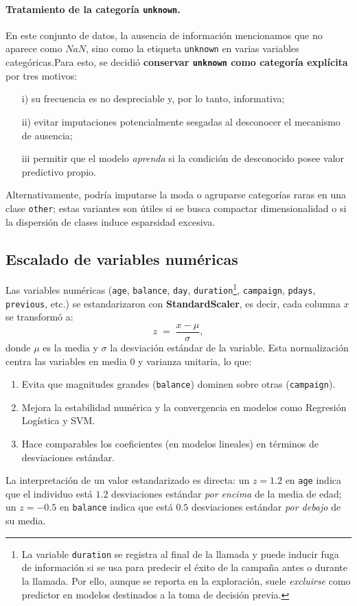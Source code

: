 \documentclass[10pt]{article}
\begin{document}
\paragraph{Tratamiento de la categoría \texttt{unknown}.}
En este conjunto de datos, la ausencia de información mencionamos que no aparece como \(NaN\), sino como la etiqueta \texttt{unknown} en varias variables categóricas.Para esto, se decidió \textbf{conservar \texttt{unknown} como categoría explícita} por tres motivos:
\begin{itemize}
    \item[i)]su frecuencia es no despreciable y, por lo tanto, informativa; 
    \item[ii)] evitar imputaciones potencialmente sesgadas al desconocer el mecanismo de ausencia; 
    \item[iii] permitir que el modelo \emph{aprenda} si la condición de desconocido posee valor predictivo propio. 
\end{itemize}
Alternativamente, podría imputarse la moda o agruparse categorías raras en una clase \texttt{other}; estas variantes son útiles si se busca compactar dimensionalidad o si la dispersión de clases induce esparsidad excesiva.

\subsection*{Escalado de variables numéricas}
Las variables numéricas (\texttt{age}, \texttt{balance}, \texttt{day}, \texttt{duration}\footnote{La variable \texttt{duration} se registra al final de la llamada y puede inducir fuga de información si se usa para predecir el éxito de la campaña antes o durante la llamada. Por ello, aunque se reporta en la exploración, suele \emph{excluirse} como predictor en modelos destinados a la toma de decisión previa.}, \texttt{campaign}, \texttt{pdays}, \texttt{previous}, etc.) se estandarizaron con \textbf{StandardScaler}, es decir, cada columna \(x\) se transformó a:
\[
z \;=\; \frac{x - \mu}{\sigma},
\]
donde \(\mu\) es la media y \(\sigma\) la desviación estándar de la variable. Esta normalización centra las variables en media \(0\) y varianza unitaria, lo que:
\begin{enumerate}
    \item Evita que magnitudes grandes (\texttt{balance}) dominen sobre otras (\texttt{campaign}).
    \item Mejora la estabilidad numérica y la convergencia en modelos como Regresión Logística y SVM.
    \item Hace comparables los coeficientes (en modelos lineales) en términos de desviaciones estándar.
\end{enumerate}
La interpretación de un valor estandarizado es directa: un \(z=1.2\) en \texttt{age} indica que el individuo está \(1.2\) desviaciones estándar \emph{por encima} de la media de edad; un \(z=-0.5\) en \texttt{balance} indica que está \(0.5\) desviaciones estándar \emph{por debajo} de su media.
\end{document}
